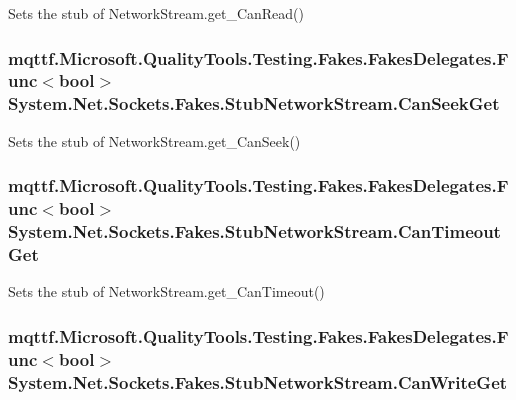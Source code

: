 Sets the stub of Network\-Stream.\-get\-\_\-\-Can\-Read()

\hypertarget{class_system_1_1_net_1_1_sockets_1_1_fakes_1_1_stub_network_stream_a73098f500b52f15f8bc8aa8e44ebe7b6}{
\subsubsection[{Can\-Seek\-Get}]{\setlength{\rightskip}{0pt plus 5cm}mqttf.\-Microsoft.\-Quality\-Tools.\-Testing.\-Fakes.\-Fakes\-Delegates.\-Func$<$bool$>$ System.\-Net.\-Sockets.\-Fakes.\-Stub\-Network\-Stream.\-Can\-Seek\-Get}}\label{class_system_1_1_net_1_1_sockets_1_1_fakes_1_1_stub_network_stream_a73098f500b52f15f8bc8aa8e44ebe7b6}


Sets the stub of Network\-Stream.\-get\-\_\-\-Can\-Seek()

\hypertarget{class_system_1_1_net_1_1_sockets_1_1_fakes_1_1_stub_network_stream_ab7a74f801d3a4718e515e912feded1a4}{
\subsubsection[{Can\-Timeout\-Get}]{\setlength{\rightskip}{0pt plus 5cm}mqttf.\-Microsoft.\-Quality\-Tools.\-Testing.\-Fakes.\-Fakes\-Delegates.\-Func$<$bool$>$ System.\-Net.\-Sockets.\-Fakes.\-Stub\-Network\-Stream.\-Can\-Timeout\-Get}}\label{class_system_1_1_net_1_1_sockets_1_1_fakes_1_1_stub_network_stream_ab7a74f801d3a4718e515e912feded1a4}


Sets the stub of Network\-Stream.\-get\-\_\-\-Can\-Timeout()

\hypertarget{class_system_1_1_net_1_1_sockets_1_1_fakes_1_1_stub_network_stream_a704188040793704ea367ae0615843147}{
\subsubsection[{Can\-Write\-Get}]{\setlength{\rightskip}{0pt plus 5cm}mqttf.\-Microsoft.\-Quality\-Tools.\-Testing.\-Fakes.\-Fakes\-Delegates.\-Func$<$bool$>$ System.\-Net.\-Sockets.\-Fakes.\-Stub\-Network\-Stream.\-Can\-Write\-Get}}\label{class_system_1_1_net_1_1_sockets_1_1_fakes_1_1_stub_network_stream_a704188040793704ea367ae0615843147}


